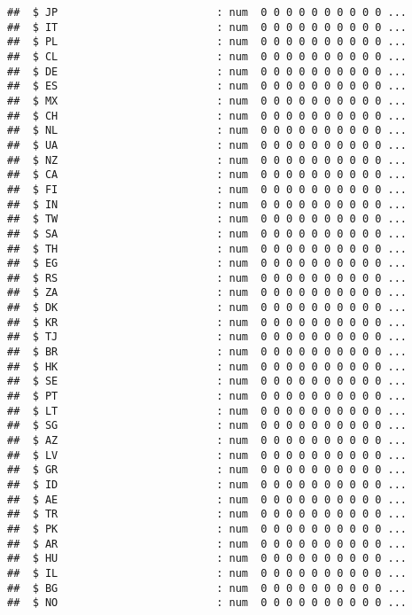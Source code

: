 \documentclass[
]{article}
\begin{document}
\begin{verbatim}
##  $ JP                         : num  0 0 0 0 0 0 0 0 0 0 ...
##  $ IT                         : num  0 0 0 0 0 0 0 0 0 0 ...
##  $ PL                         : num  0 0 0 0 0 0 0 0 0 0 ...
##  $ CL                         : num  0 0 0 0 0 0 0 0 0 0 ...
##  $ DE                         : num  0 0 0 0 0 0 0 0 0 0 ...
##  $ ES                         : num  0 0 0 0 0 0 0 0 0 0 ...
##  $ MX                         : num  0 0 0 0 0 0 0 0 0 0 ...
##  $ CH                         : num  0 0 0 0 0 0 0 0 0 0 ...
##  $ NL                         : num  0 0 0 0 0 0 0 0 0 0 ...
##  $ UA                         : num  0 0 0 0 0 0 0 0 0 0 ...
##  $ NZ                         : num  0 0 0 0 0 0 0 0 0 0 ...
##  $ CA                         : num  0 0 0 0 0 0 0 0 0 0 ...
##  $ FI                         : num  0 0 0 0 0 0 0 0 0 0 ...
##  $ IN                         : num  0 0 0 0 0 0 0 0 0 0 ...
##  $ TW                         : num  0 0 0 0 0 0 0 0 0 0 ...
##  $ SA                         : num  0 0 0 0 0 0 0 0 0 0 ...
##  $ TH                         : num  0 0 0 0 0 0 0 0 0 0 ...
##  $ EG                         : num  0 0 0 0 0 0 0 0 0 0 ...
##  $ RS                         : num  0 0 0 0 0 0 0 0 0 0 ...
##  $ ZA                         : num  0 0 0 0 0 0 0 0 0 0 ...
##  $ DK                         : num  0 0 0 0 0 0 0 0 0 0 ...
##  $ KR                         : num  0 0 0 0 0 0 0 0 0 0 ...
##  $ TJ                         : num  0 0 0 0 0 0 0 0 0 0 ...
##  $ BR                         : num  0 0 0 0 0 0 0 0 0 0 ...
##  $ HK                         : num  0 0 0 0 0 0 0 0 0 0 ...
##  $ SE                         : num  0 0 0 0 0 0 0 0 0 0 ...
##  $ PT                         : num  0 0 0 0 0 0 0 0 0 0 ...
##  $ LT                         : num  0 0 0 0 0 0 0 0 0 0 ...
##  $ SG                         : num  0 0 0 0 0 0 0 0 0 0 ...
##  $ AZ                         : num  0 0 0 0 0 0 0 0 0 0 ...
##  $ LV                         : num  0 0 0 0 0 0 0 0 0 0 ...
##  $ GR                         : num  0 0 0 0 0 0 0 0 0 0 ...
##  $ ID                         : num  0 0 0 0 0 0 0 0 0 0 ...
##  $ AE                         : num  0 0 0 0 0 0 0 0 0 0 ...
##  $ TR                         : num  0 0 0 0 0 0 0 0 0 0 ...
##  $ PK                         : num  0 0 0 0 0 0 0 0 0 0 ...
##  $ AR                         : num  0 0 0 0 0 0 0 0 0 0 ...
##  $ HU                         : num  0 0 0 0 0 0 0 0 0 0 ...
##  $ IL                         : num  0 0 0 0 0 0 0 0 0 0 ...
##  $ BG                         : num  0 0 0 0 0 0 0 0 0 0 ...
##  $ NO                         : num  0 0 0 0 0 0 0 0 0 0 ...

\end{verbatim}
\end{document}
